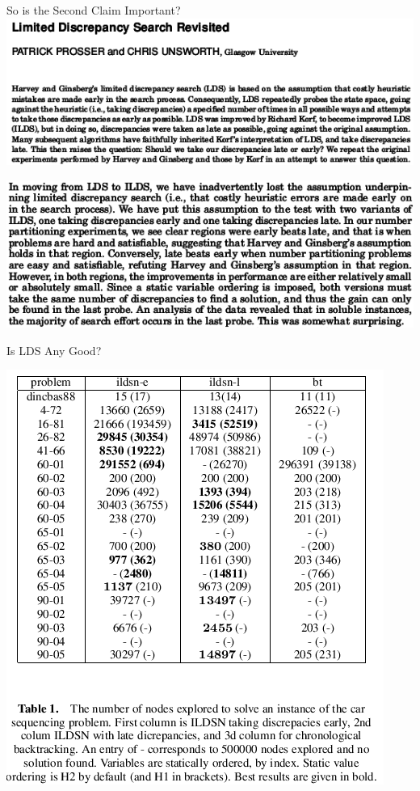 \documentclass{beamer}
\begin{document}
\begin{frame}{So is the Second Claim Important?}
    \centering\includegraphics*[keepaspectratio=true,scale=0.4]{images/ldsr-paper.png}

    \vspace{2em}

    \centering\includegraphics*[keepaspectratio=true,scale=0.4]{images/ldsr-conclusion.png}

    \vspace{0em}

\end{frame}

\begin{frame}{Is LDS Any Good?}
    \begin{center}
        \centering\includegraphics*[keepaspectratio=true,scale=0.3]{images/lds-car-sequencing.png}
    \end{center}
\end{frame}
\end{document}
